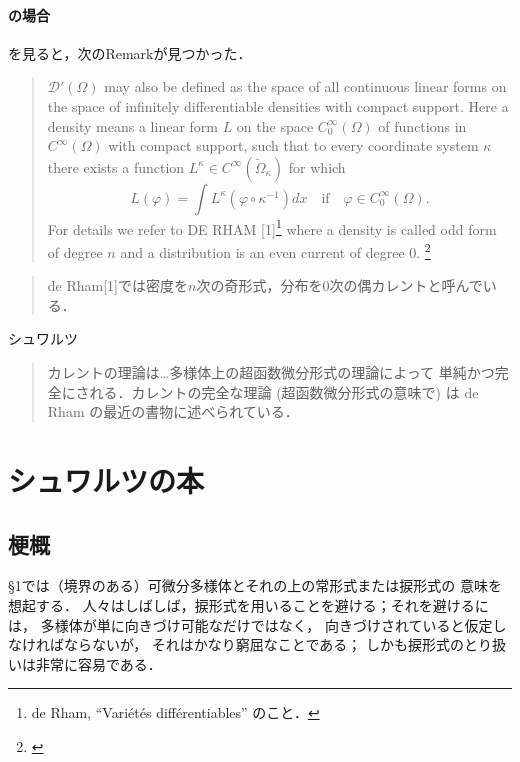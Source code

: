 \paragraph{\cite{Hor63,Hor89}の場合}
\cite{Hor63}を見ると，次のRemarkが見つかった．
\begin{quotation}
    \(\mathscr{D}'(\varOmega)\) may also be defined 
    as the space of all continuous linear forms 
    on the space of infinitely differentiable densities 
    with compact support. 
    Here a density means a linear form \(L\) 
    on the space \(C_0^\infty(\varOmega)\) of functions 
    in \(C^\infty(\varOmega)\) with compact support, 
    such that to every coordinate system \(\kappa\) 
    there exists a function \(L^\kappa\in C^\infty(\tilde{\varOmega}_\kappa)\) for which
    \[
        L(\varphi)= \int L^\kappa(\varphi\circ\kappa^{-1})dx
        \quad \text{if} \quad \varphi\in C_0^\infty(\varOmega).
    \]
    For details we refer to DE RHAM [1]\footnote{de Rham, ``Vari\'et\'es diff\'erentiables'' のこと．} 
    where a density is called odd form of degree \(n\) 
    and a distribution is an even current of degree 0.
    \footnote{\cite[p.28]{Hor63}}
\end{quotation}

\begin{quotation}
    de Rham[1]では密度を\(n\)次の奇形式，分布を0次の偶カレントと呼んでいる．
\end{quotation}

シュワルツ
\begin{quotation}
    カレントの理論は\dots 多様体上の超函数微分形式の理論によって
    単純かつ完全にされる．カレントの完全な理論 (超函数微分形式の意味で) は
    de Rham の最近の書物に述べられている．
\end{quotation}

\section{シュワルツの本}

\subsection*{梗概}
\S1では（境界のある）可微分多様体とそれの上の常形式または捩形式の
意味を想起する．
人々はしばしば，捩形式を用いることを避ける；それを避けるには，
多様体が単に向きづけ可能なだけではなく，
向きづけされていると仮定しなければならないが，
それはかなり窮屈なことである；
しかも捩形式のとり扱いは非常に容易である．

